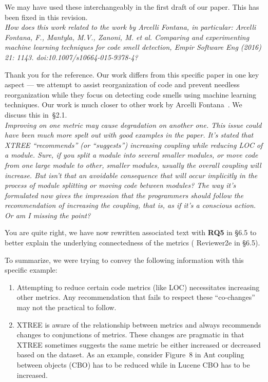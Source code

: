 \documentclass[twocolumn,5p]{elsarticle}
\newcommand{\be}{\begin{enumerate}}
\newcommand{\ee}{\end{enumerate}}
\newcommand{\tion}[1]{\S#1}
\newcommand{\fig}[1]{Figure~#1}
\newcommand{\review}[1]{\noindent\textit{#1\\}}
\theoremstyle{break}
\begin{document}
We may have used these interchangeably in the first draft of our paper. 
This has been fixed in this revision.\\

\review{How does this work related to the work by Arcelli Fontana, in 
	particular: Arcelli Fontana, F., Mantyla, M.V., Zanoni, M. et al. Comparing 
	and experimenting machine learning techniques for code smell detection, 
	Empir Software Eng (2016) 21: 1143. doi:10.1007/s10664-015-9378-4?}	

Thank you for the reference. Our work differs from this specific paper in 
one 
key aspect --- we attempt to assist reorganization of code and prevent 
needless reorganization while they focus on 
detecting code smells using machine learning techniques. Our work is much 
closer to other work by Arcelli Fontana~\cite{font1}. We discuss this 
in~\tion{2.1}. \\


\review{Improving on one metric may cause degradation 
	on another one. This issue could have been much more spelt out with good 
	examples in the paper. It's stated that XTREE “recommends” 
	(or “suggests”) increasing coupling while reducing LOC of a module. Sure, 
	if you split a module into several smaller modules, or move code from one 
	large module to other, smaller modules, usually the overall coupling will 
	increase.  But isn't that an avoidable consequence that will occur 
	implicitly in the process of module splitting or moving code between 
	modules? The way it’s formulated now gives the impression that the 
	programmers should follow the recommendation of increasing the coupling, 
	that is, as if it’s a conscious action. Or am I missing the point?}

You are quite right, we have now rewritten associated text with 
\textbf{RQ5} in \tion{6.5} to better explain 
the underlying connectedness of the metrics ({\color{steel} Reviewer2e} in 
\tion{6.5}). 

To summarize, we were trying to convey the following information with this 
specific example:

\be

\item
Attempting to reduce certain code metrics (like LOC) necessitates 
increasing other metrics. Any recommendation that fails to respect these 
``co-changes'' may not the practical to follow.
\item  XTREE is aware of 
the relationship between metrics and always recommends changes to 
conjunctions of metrics. These changes are pragmatic in that XTREE 
sometimes suggests the same metric be either increased or decreased based 
on the dataset. As an example, consider \fig{8} in Ant coupling 
between objects (CBO) has to be reduced while in Lucene CBO has to be 
increased.
\ee
\end{document}
